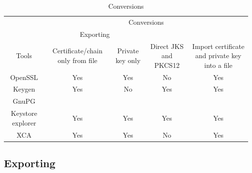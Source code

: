\documentclass[10pt, a4paper]{report}
\begin{document}
\begin{table}[h!]
\centering
\caption{Conversions}
\label{my-label}
\begin{adjustbox}{max width=\textwidth}
\begin{tabular}{|c|c|c|c|c|}
\hline
                        & \multicolumn{4}{c|}{Conversions}                                                                                                                                            \\ \cline{2-5} 
                        & \multicolumn{2}{c|}{Exporting}                                 &                                         &                                                                  \\ \cline{2-3}
\multirow{-3}{*}{Tools} & Certificate/chain only from file & Private key only            & \multirow{-2}{*}{Direct JKS and PKCS12} & \multirow{-2}{*}{Import certificate and private key into a file} \\ \hline
OpenSSL                 & \cellcolor[HTML]{34FF34}Yes      & \cellcolor[HTML]{34FF34}Yes & \cellcolor[HTML]{FF3A3A}No              & \cellcolor[HTML]{34FF34}Yes                                      \\ \hline
Keygen                  & \cellcolor[HTML]{34FF34}Yes      & \cellcolor[HTML]{FE0000}No  & \cellcolor[HTML]{34FF34}Yes             & \cellcolor[HTML]{34FF34}Yes                                      \\ \hline
GnuPG                   &                                  &                             &                                         &                                                                  \\ \hline
Keystore explorer       & \cellcolor[HTML]{34FF34}Yes      & \cellcolor[HTML]{34FF34}Yes & \cellcolor[HTML]{34FF34}Yes             & \cellcolor[HTML]{34FF34}Yes                                      \\ \hline
XCA                     & \cellcolor[HTML]{34FF34}Yes      & \cellcolor[HTML]{34FF34}Yes & \cellcolor[HTML]{FF3A3A}No              & \cellcolor[HTML]{34FF34}Yes                                      \\ \hline
\end{tabular}
\end{adjustbox}
\end{table}


\subsection{Exporting}
\end{document}
